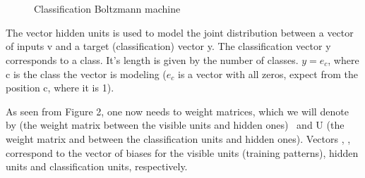 \ \ \ \ \ \ \ \ \ \ \ \ \ \ \ \ \ \ \ \ \ \ \ \begin{figure}[h]
  \ \ \ \ \ \ \ \ \ \ 
  \caption{Classification Boltzmann machine}
\end{figure}



The vector hidden units is used to model the joint distribution between a
vector of inputs v and a target (classification) vector y. The classification
vector y corresponds to a class. It's length is given by the number of
classes. $y = e_c$, where c is the class the vector is modeling ($e_c$ is a
vector with all zeros, expect from the position c, where it is 1).

As seen from Figure 2, one now needs to weight matrices, which we will denote
by (the weight matrix between the visible units and hidden ones) \
and U (the weight matrix and between the classification units and hidden
ones). Vectors \tmtextit{b}, \tmtextit{c}, \tmtextit{d} correspond to the
vector of biases for the visible units (training patterns), hidden units and
classification units, respectively.


